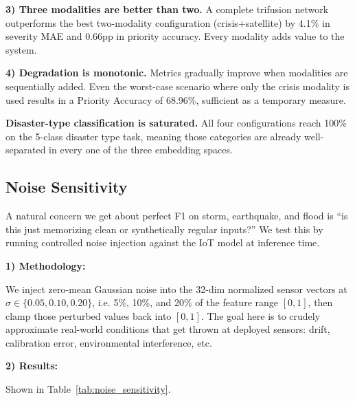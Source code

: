 \documentclass[journal]{IEEEtran}
\begin{document}
\textbf{3) Three modalities are better than two.} A complete trifusion network outperforms the best two-modality configuration (crisis+satellite) by 4.1\% in severity MAE and 0.66pp in priority accuracy. Every modality adds value to the system.

\textbf{4) Degradation is monotonic.} Metrics gradually improve when modalities are sequentially added. Even the worst-case scenario where only the crisis modality is used results in a Priority Accuracy of 68.96\%, sufficient as a temporary measure.

\textbf{Disaster-type classification is saturated.} All four configurations reach 100\% on the 5-class disaster type task, meaning those categories are already well-separated in every one of the three embedding spaces.

\subsection{Noise Sensitivity}
\label{sec:noise_sensitivity}

A natural concern we get about perfect F1 on storm, earthquake, and flood is ``is this just memorizing clean or synthetically regular inputs?'' We test this by running controlled noise injection against the IoT model at inference time.

\textbf{1) Methodology:}

We inject zero-mean Gaussian noise into the 32-dim normalized sensor vectors at $\sigma \in \{0.05, 0.10, 0.20\}$, i.e. 5\%, 10\%, and 20\% of the feature range $[0, 1]$, then clamp those perturbed values back into $[0, 1]$. The goal here is to crudely approximate real-world conditions that get thrown at deployed sensors: drift, calibration error, environmental interference, etc.

\textbf{2) Results:}

Shown in Table~\ref{tab:noise_sensitivity}.
\end{document}
